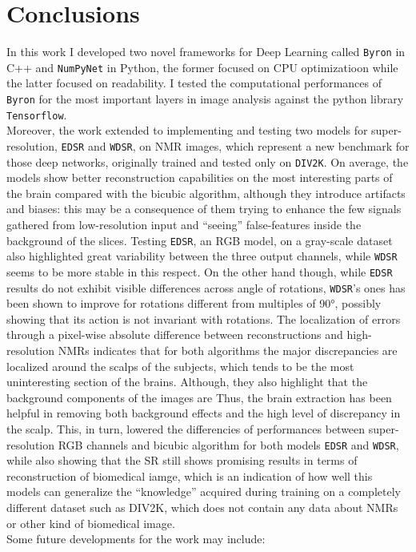 \documentclass[12pt,a4paper]{report}
\begin{document}
\chapter{Conclusions}
In this work I developed two novel frameworks for Deep Learning called {\tt Byron} in C++ and {\tt NumPyNet} in Python, the former focused on CPU optimizatioon while the latter focused on readability.
I tested the computational performances of {\tt Byron} for the most important layers in image analysis against the python library {\tt Tensorflow}.   
\\
Moreover, the work extended to implementing and testing two models for super-resolution, {\tt EDSR} and {\tt WDSR}, on NMR images, which represent a new benchmark for those deep networks, originally trained and tested only on {\tt DIV2K}.
On average, the models show better reconstruction capabilities on the most interesting parts of the brain compared with the bicubic algorithm, although they introduce artifacts and biases: this may be a consequence of them trying to enhance the few signals gathered from low-resolution input and ``seeing'' false-features inside the background of the slices.
Testing {\tt EDSR}, an RGB model, on a gray-scale dataset also highlighted great variability between the three output channels, while {\tt WDSR} seems to be more stable in this respect.
On the other hand though, while {\tt EDSR} results do not exhibit visible differences across angle of rotations, {\tt WDSR}'s ones has been shown to improve for rotations different from multiples of 90°, possibly showing that its action is not invariant with rotations.
The localization of errors through a pixel-wise absolute difference between reconstructions and high-resolution NMRs indicates that for both algorithms the major discrepancies are localized around the scalps of the subjects, which tends to be the most uninteresting section of the brains. 
Although, they also highlight that the background components of the images are 
Thus, the brain extraction has been helpful in removing both background effects and the high level of discrepancy in the scalp. 
This, in turn, lowered the differencies of performances between super-resolution RGB channels and bicubic algorithm for both models {\tt EDSR} and {\tt WDSR}, while also showing that the SR still shows promising results in terms of reconstruction  of biomedical iamge, which is an indication of how well this models can generalize the ``knowledge'' acquired during training on a completely different dataset such as DIV2K, which does not contain any data about NMRs or other kind of biomedical image.
\\
Some future developments for the work may include:
\end{document}
